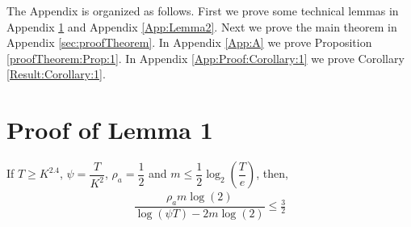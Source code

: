 
\appendix
The Appendix is organized as follows. First we prove some technical lemmas in Appendix \ref{App:Lemma1} and Appendix \ref{App:Lemma2}. Next we prove the main theorem in Appendix \ref{sec:proofTheorem}. In Appendix \ref{App:A} we prove Proposition \ref{proofTheorem:Prop:1}. In Appendix \ref{App:Proof:Corollary:1} we prove Corollary \ref{Result:Corollary:1}.



\section{Proof of Lemma 1}
\label{App:Lemma1}

\begin{lemma}
\label{proofTheorem:Lemma:1}
If $T\geq K^{2.4}$, $\psi=\dfrac{T}{ K^2}$, $\rho_a =\dfrac{1}{2}$ and $m\leq \dfrac{1}{2} \log_2\left(\dfrac{T}{e}\right) $, then,
\begin{align*}
\dfrac{\rho_a m \log(2)}{\log(\psi T) - 2m\log( 2)} \leq \frac{3}{2}
\end{align*}
\end{lemma}

